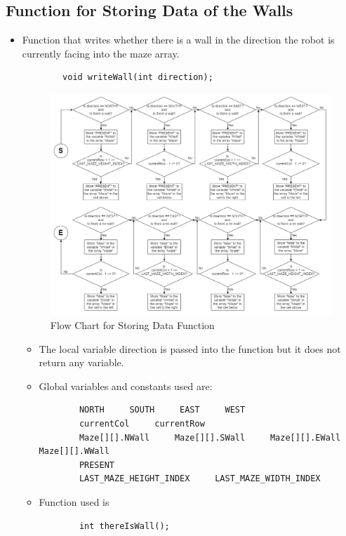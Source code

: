 \documentclass[11pt]{article}
\begin{document}
\subsection{Function for Storing Data of the Walls}
\begin{itemize}
\item Function that writes whether there is a wall in the direction the robot is currently facing into the maze array.
	\begin{verbatim}
		void writeWall(int direction);
	\end{verbatim}
\begin{figure}[htp]
\centering
\includegraphics[scale=0.4]{images/Software_Flowchart/writeWall.png}
\caption{Flow Chart for Storing Data Function}
\label{}
\end{figure}
	\begin{itemize}
	\item The local variable direction is passed into the function but it does not return any variable.
	\item Global variables and constants used are:
	\begin{verbatim}
		NORTH     SOUTH     EAST     WEST
		currentCol     currentRow
		Maze[][].NWall     Maze[][].SWall     Maze[][].EWall     Maze[][].WWall
		PRESENT
		LAST_MAZE_HEIGHT_INDEX     LAST_MAZE_WIDTH_INDEX
	\end{verbatim}
	\item Function used is
	\begin{verbatim}
		int thereIsWall();
	\end{verbatim}
	\end{itemize}
\end{itemize}
\newpage
\end{document}
